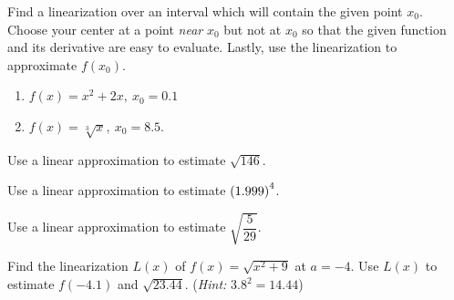 \documentclass[mathNotesPreamble]{subfiles}
\begin{document}
\pagebreak
\begin{ex*}
  Find a linearization over an interval which will contain the given point $x_0$. Choose your center at a point \textit{near} $x_0$ but not at $x_0$ so that the given function and its derivative are easy to evaluate. Lastly, use the linearization to approximate $f(x_0)$.
\end{ex*}
\begin{enumerate}[label=\alph*), itemsep=\stretch{1}]
  \item $f(x)=x^2+2x,\ x_0=0.1$
  \item $f(x)=\sqrt[3]{x},\ x_0=8.5$.
\end{enumerate}
\pagebreak

\begin{ex*}
  Use a linear approximation to estimate $\sqrt{146}$.
\end{ex*}

\begin{ex*}
  Use a linear approximation to estimate ${\left(1.999\right)}^4$.
\end{ex*}

\begin{ex*}
  Use a linear approximation to estimate $\sqrt{\dfrac{5}{29}}$.
\end{ex*}
\pagebreak

\begin{ex*}
  Find the linearization $L(x)$ of $f(x)=\sqrt{x^2+9}$ at $a=-4$. Use $L(x)$ to estimate $f(-4.1)$ and $\sqrt{23.44}$. (\textit{Hint:} $3.8^2=14.44$)
\end{ex*}
  
\end{document}
